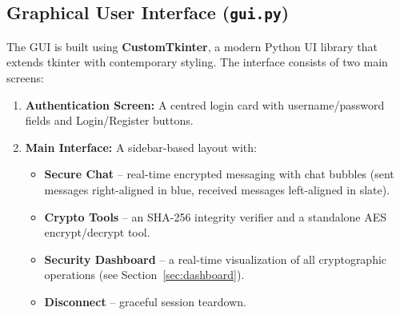\documentclass[12pt,a4paper]{article}
\begin{document}
\subsection{Graphical User Interface (\texttt{gui.py})}

The GUI is built using \textbf{CustomTkinter}, a modern Python UI library that extends tkinter with contemporary styling. The interface consists of two main screens:

\begin{enumerate}
    \item \textbf{Authentication Screen:} A centred login card with username/password fields and Login/Register buttons.
    \item \textbf{Main Interface:} A sidebar-based layout with:
    \begin{itemize}
        \item \textbf{Secure Chat} -- real-time encrypted messaging with chat bubbles (sent messages right-aligned in blue, received messages left-aligned in slate).
        \item \textbf{Crypto Tools} -- an SHA-256 integrity verifier and a standalone AES encrypt/decrypt tool.
        \item \textbf{Security Dashboard} -- a real-time visualization of all cryptographic operations (see Section~\ref{sec:dashboard}).
        \item \textbf{Disconnect} -- graceful session teardown.
    \end{itemize}
\end{enumerate}
\end{document}
